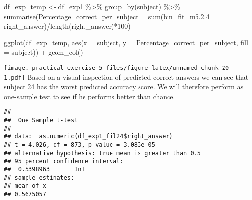 \documentclass[
]{article}
\newenvironment{Shaded}{\begin{snugshade}}{\end{snugshade}}
\newcommand{\AttributeTok}[1]{\textcolor[rgb]{0.77,0.63,0.00}{#1}}
\newcommand{\CommentTok}[1]{\textcolor[rgb]{0.56,0.35,0.01}{\textit{#1}}}
\newcommand{\DecValTok}[1]{\textcolor[rgb]{0.00,0.00,0.81}{#1}}
\newcommand{\FloatTok}[1]{\textcolor[rgb]{0.00,0.00,0.81}{#1}}
\newcommand{\FunctionTok}[1]{\textcolor[rgb]{0.00,0.00,0.00}{#1}}
\newcommand{\NormalTok}[1]{#1}
\newcommand{\OtherTok}[1]{\textcolor[rgb]{0.56,0.35,0.01}{#1}}
\newcommand{\SpecialCharTok}[1]{\textcolor[rgb]{0.00,0.00,0.00}{#1}}
\newcommand{\StringTok}[1]{\textcolor[rgb]{0.31,0.60,0.02}{#1}}
\begin{document}
\begin{Shaded}
\begin{Highlighting}[]
\NormalTok{df\_exp\_temp }\OtherTok{\textless{}{-}}\NormalTok{ df\_exp1 }\SpecialCharTok{\%\textgreater{}\%} 
  \FunctionTok{group\_by}\NormalTok{(subject) }\SpecialCharTok{\%\textgreater{}\%} 
  \FunctionTok{summarise}\NormalTok{(}\AttributeTok{Percentage\_correct\_per\_subject =} \FunctionTok{sum}\NormalTok{(bin\_fit\_m5.}\FloatTok{2.4} \SpecialCharTok{==}\NormalTok{ right\_answer)}\SpecialCharTok{/}\FunctionTok{length}\NormalTok{(right\_answer)}\SpecialCharTok{*}\DecValTok{100}\NormalTok{)}

\FunctionTok{ggplot}\NormalTok{(df\_exp\_temp, }\FunctionTok{aes}\NormalTok{(}\AttributeTok{x =}\NormalTok{ subject, }\AttributeTok{y =}\NormalTok{ Percentage\_correct\_per\_subject, }\AttributeTok{fill =}\NormalTok{ subject)) }\SpecialCharTok{+} \FunctionTok{geom\_col}\NormalTok{()}
\end{Highlighting}
\end{Shaded}

\texttt{[image: practical\_exercise\_5\_files/figure-latex/unnamed-chunk-20-1.pdf]}
Based on a visual inspection of predicted correct answers we can see
that subject 24 has the worst predicted accuracy score. We will
therefore perform as one-sample test to see if he performs better than
chance.

\begin{Shaded}
\end{Shaded}

\begin{verbatim}
## 
##  One Sample t-test
## 
## data:  as.numeric(df_exp1_fil24$right_answer)
## t = 4.026, df = 873, p-value = 3.083e-05
## alternative hypothesis: true mean is greater than 0.5
## 95 percent confidence interval:
##  0.5398963       Inf
## sample estimates:
## mean of x 
## 0.5675057
\end{verbatim}
\end{document}
